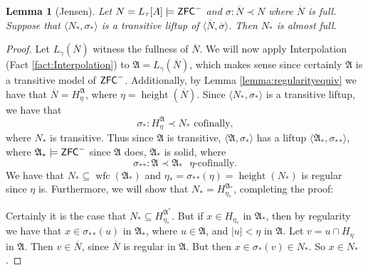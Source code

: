 \documentclass{amsart}
\newtheorem{lemma}[theorem]{Lemma}
\theoremstyle{definition}
\theoremstyle{remark}
\newcommand{\N}{{\overline{N}}}
\newcommand{\ZFC}{\textup{\ensuremath{\textsf{ZFC}}}}
\DeclareMathOperator{\height}{height}
\DeclareMathOperator{\wfc}{wfc}
\begin{document}
\begin{lemma}[Jensen]\label{lemma:liftupfull} Let $N =L_\tau[A] \models \ZFC^-$ and $\sigma: \N \prec N$ where $\N$ is full. Suppose that $\langle N_*, \sigma_* \rangle$ is a transitive liftup of $\langle \N, \overline \sigma \rangle$. Then $N_*$ is almost full. \end{lemma}
\begin{proof}
	Let $L_\gamma(\N)$ witness the fullness of $\N$. We will now apply Interpolation (Fact \ref{fact:Interpolation}) to $\mathfrak A= L_\gamma(\N)$, which makes sense since certainly $\mathfrak A$ is a transitive model of $\ZFC^-$. Additionally, by Lemma \ref{lemma:regularityequiv} we have that $\N = H_\eta^{\mathfrak A}$, where $\eta = \height(\N)$. 
	Since $\langle N_*, \sigma_* \rangle$ is a transitive liftup, we have that $$\sigma_*: H_\eta^{\mathfrak A} \prec N_* \text{ cofinally,}$$ where $N_*$ is transitive. Thus since $\mathfrak A$ is transitive, $\langle \mathfrak A, \sigma_* \rangle$ has a liftup $\langle \mathfrak A_*, {\sigma_*}_* \rangle$, where $\mathfrak A_* \models \ZFC^-$ since $\mathfrak A$ does, $\mathfrak A_*$ is solid, where $${\sigma_*}_* : \mathfrak A \prec \mathfrak A_* \text{ $\eta$-cofinally.}$$ 
	We have that  $N_* \subseteq \wfc({\mathfrak A}_*)$ and $\eta_*= {\sigma_*}_*(\eta)=\height(N_*)$ is regular since $\eta$ is. Furthermore, we will show that $N_* = H_{\eta_*}^{\mathfrak A_*}$, completing the proof:
	
	Certainly it is the case that $N_* \subseteq H_{\eta_*}^{\mathfrak A^*}$. 
	But if $x \in H_{\eta_*}$ in $\mathfrak A_*$, then by regularity we have that $x \in {\sigma_*}_*(u)$ in $\mathfrak A_*$, where $u \in \mathfrak A$, and $|u| < \eta$ in $\mathfrak A$. Let $v=u \cap H_\eta$ in $\mathfrak A$. Then $v \in \N$, since $\N$ is regular in $\mathfrak A$. But then $x \in \sigma_*(v) \in N_*$. So $x \in N_*$.
\end{proof}
\end{document}
